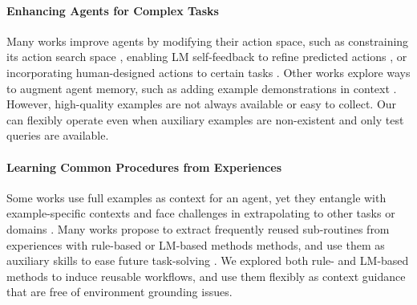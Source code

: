 \paragraph{Enhancing Agents for Complex Tasks}
Many works improve agents by modifying their action space, such as constraining its action search space \citep{zheran2018reinforcement}, enabling LM self-feedback to refine predicted actions  \citep{sun2023adaplanner}, or incorporating human-designed actions to certain tasks \citep{sodhi2023heap}. 
Other works explore ways to augment agent memory, such as adding example demonstrations in context \citep{haluptzok2023language,zheng2024synapse,fu2024autoguide}. However, high-quality examples are not always available or easy to collect. 
Our \awm can flexibly operate even when auxiliary examples are non-existent and only test queries are available.
% 

\vspace{-1mm}
\paragraph{Learning Common Procedures from Experiences}
Some works use full examples \citep{zheng2024synapse} as context for an agent, yet they entangle with example-specific contexts and face challenges in extrapolating to other tasks or domains \citep{majumder2023clin}. Many works propose to extract frequently reused sub-routines from experiences with rule-based \citep{ellis2023dreamcoder,bowers2023top,grand2023lilo} or LM-based methods \citep{cai2023large,wang2024trove,wang2024voyager} methods, and use them as auxiliary skills to ease future task-solving \citep{oh2017zero,liang2023code,yu2023language,mao2023learning}. We explored both rule- and LM-based methods to induce reusable workflows, and use them flexibly as context guidance that are free of environment grounding issues.